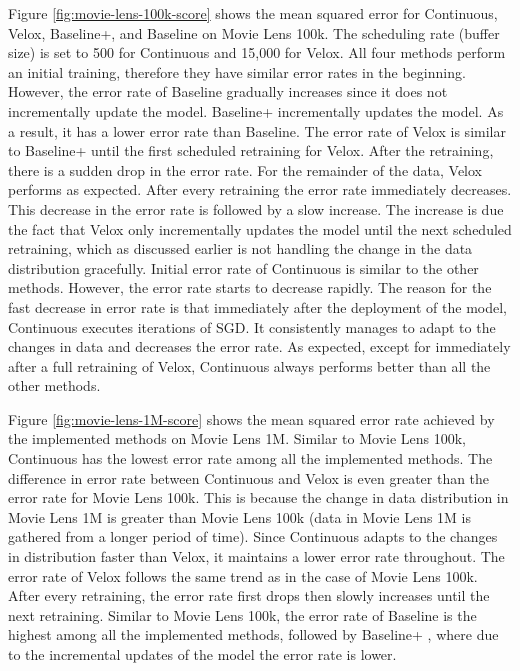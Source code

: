 \documentclass[10pt,conference,letterpaper]{IEEEtran}
\begin{document}
Figure \ref{fig:movie-lens-100k-score} shows the mean squared error for Continuous, Velox, Baseline+, and Baseline on Movie Lens 100k.
The scheduling rate (buffer size) is set to 500 for Continuous and 15,000 for Velox.
All four methods perform an initial training, therefore they have similar error rates in the beginning.
However, the error rate of Baseline gradually increases since it does not incrementally update the model.
Baseline+ incrementally updates the model.
As a result, it has a lower error rate than Baseline.
The error rate of Velox is similar to Baseline+ until the first scheduled retraining for Velox.
After the retraining, there is a sudden drop in the error rate.
For the remainder of the data, Velox performs as expected.
After every retraining the error rate immediately decreases.
This decrease in the error rate is followed by a slow increase.
The increase is due the fact that Velox only incrementally updates the model until the next scheduled retraining, which as discussed earlier is not handling the change in the data distribution gracefully.
Initial error rate of Continuous is similar to the other methods.
However, the error rate starts to decrease rapidly.
The reason for the fast decrease in error rate is that immediately after the deployment of the model, Continuous executes iterations of SGD.
It consistently manages to adapt to the changes in data and decreases the error rate.
As expected, except for immediately after a full retraining of Velox, Continuous always performs better than all the other methods.

Figure \ref{fig:movie-lens-1M-score} shows the mean squared error rate achieved by the implemented methods on Movie Lens 1M.
Similar to Movie Lens 100k, Continuous has the lowest error rate among all the implemented methods.
The difference in error rate between Continuous and Velox is even greater than the error rate for Movie Lens 100k.
This is because the change in data distribution in Movie Lens 1M is greater than Movie Lens 100k (data in Movie Lens 1M is gathered from a longer period of time).
Since Continuous adapts to the changes in distribution faster than Velox, it maintains a lower error rate throughout.
The error rate of Velox follows the same trend as in the case of Movie Lens 100k. 
After every retraining, the error rate first drops then slowly increases until the next retraining.
Similar to Movie Lens 100k, the error rate of Baseline is the highest among all the implemented methods, followed by Baseline+ , where due to the incremental updates of the model the error rate is lower.
\end{document}

